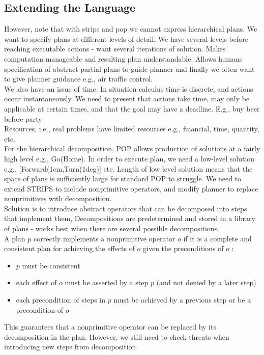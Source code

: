 \documentclass[a4paper]{article}
\theoremstyle{plain}
\theoremstyle{definition}
\theoremstyle{remark}
\begin{document}
\subsection{Extending the Language}

However, note that with strips and pop we cannot express hierarchical plans. We want to specify plans at different levels of detail. We have several levels before reaching executable actions - want several iterations of solution. Makes computation manageable and resulting plan understandable. Allows humans specification of abstract partial plans to guide planner and finally we often want to give planner guidance e.g., air traffic control. \\
We also have an issue of time. In situation calculus time is discrete, and actions occur instantaneously. We need to present that actions take time, may only be applicable at certain times, and that the goal may have a deadline. E.g., buy beer before party\\
Resources, i.e., real problems have limited resources e.g., financial, time, quantity, etc.\\
For the hierarchical decomposition, POP allows production of solutions at a fairly high level e.g., Go(Home). In order to execute plan, we need a low-level solution e.g., [Forward(1cm,Turn(1deg)] etc. Length of low level solution means that the space of plans is sufficiently large for standard POP to struggle. We need to extend STRIPS to include nonprimitive operators, and modify planner to replace nonprimitives with decomposition. \\
Solution is to introduce abstract operators that can be decomposed into steps that implement them, Decompositions are predetermined and stored in a library of plans - works best when there are several possible decompositions. \\
A plan $p$ correctly implements a nonprimitive operator $o$ if it is a complete and consistent plan for achieving the effects of $o$ given the preconditions of $o$ :
\begin{itemize}
	\item $p$ must be consistent
	\item each effect of $o$ must be asserted by a step $p$ (and not denied by a later step)
	\item each precondition of steps in $p$ must be achieved by a previous step or be a precondition of $o$
\end{itemize}
This guarantees that a nonprimitive operator can be replaced by its decomposition in the plan. However, we still need to check threats when introducing new steps from decomposition.
\end{document}
